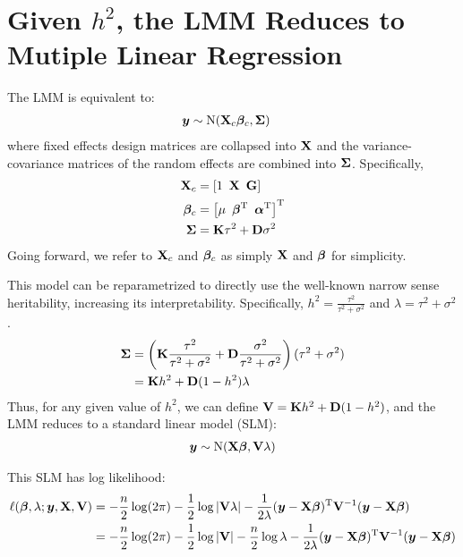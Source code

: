 


\section{Given $h^2$, the LMM Reduces to Mutiple Linear Regression}

The LMM is equivalent to:
\begin{align}
    \bm{y} &\sim \mathrm{N}(\mathbf{X}_c\boldsymbol{\beta}_c, \mathbf{\Sigma})
\end{align}
where fixed effects design matrices are collapsed into $\mathbf{X}$ and the variance-covariance matrices of the random effects are combined into $\mathbf{\Sigma}$.
Specifically,
\begin{align}
    \mathbf{X}_c     &= \left[1 \enspace \mathbf{X} \enspace \mathbf{G} \right]\\
    \boldsymbol{\beta}_c  &= \left[\mu \enspace \boldsymbol{\beta}^\mathrm{T} \enspace \boldsymbol{\alpha}^\mathrm{T} \right]^\mathrm{T}\\
    \mathbf{\Sigma} &= \mathbf{K} \tau^2 + \mathbf{D} \sigma^2
\end{align}
Going forward, we refer to $\mathbf{X}_c$ and $\boldsymbol{\beta}_c$ as simply $\mathbf{X}$ and $\boldsymbol{\beta}$ for simplicity.

This model can be reparametrized to directly use the well-known narrow sense heritability, increasing its interpretability.
Specifically, $h^2 = \frac{\tau^2}{\tau^2 + \sigma^2}$ and $\lambda = \tau^2 + \sigma^2$.
\begin{align}
	\mathbf{\Sigma} &= \left(\mathbf{K} \frac{\tau^2}{\tau^2 + \sigma^2} + \mathbf{D} \frac{\sigma^2}{\tau^2 + \sigma^2}\right) (\tau^2 + \sigma^2)\\
			&= \mathbf{K} h^2 + \mathbf{D} (1 - h^2) \lambda
\end{align}
Thus, for any given value of $h^2$, we can define $\mathbf{V} = \mathbf{K} h^2 + \mathbf{D} (1 - h^2)$, and the LMM reduces to a standard linear model (SLM):
\begin{align}
    \bm{y} \sim \mathrm{N}(\mathbf{X}\boldsymbol{\beta}, \mathbf{V} \lambda)     \label{eq:gls}
\end{align}

This SLM has log likelihood:
\begin{align}
    \ell(\boldsymbol{\beta}, \lambda; \bm{y}, \mathbf{X}, \mathbf{V}) &= 
        -\frac{n}{2}\log(2\pi)
        -\frac{1}{2}\log|\mathbf{V}\lambda|
        -           \frac{1}{2\lambda}
            (\bm{y}-\mathbf{X}\boldsymbol{\beta})^\mathrm{T}\mathbf{V}^{-1}(\bm{y}-\mathbf{X}\boldsymbol{\beta}) \\
    &= 
        -\frac{n}{2}\log(2\pi)
        -\frac{1}{2}\log|\mathbf{V}|
        -\frac{n}{2}\log\lambda
        - \frac{1}{2\lambda}
            (\bm{y}-\mathbf{X}\boldsymbol{\beta})^\mathrm{T}\mathbf{V}^{-1}(\bm{y}-\mathbf{X}\boldsymbol{\beta})
\end{align}

